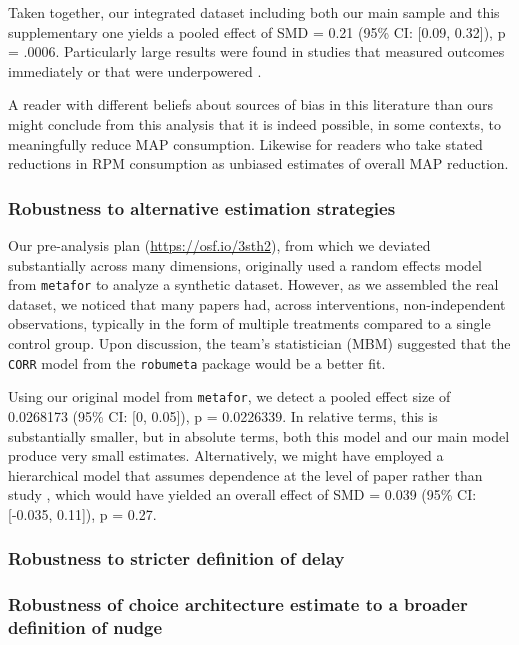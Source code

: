 \documentclass[sn-nature,referee,pdflatex]{sn-jnl}
\begin{document}
Taken together, our integrated dataset including both our main sample
and this supplementary one yields a pooled effect of SMD = 0.21 (95\%
CI: {[}0.09, 0.32{]}), p = .0006. Particularly large results were found
in studies that measured outcomes immediately \citep{hansen2021} or that
were underpowered \citep{lentz2020}.

A reader with different beliefs about sources of bias in this literature
than ours might conclude from this analysis that it is indeed possible,
in some contexts, to meaningfully reduce MAP consumption. Likewise for
readers who take stated reductions in RPM consumption as unbiased
estimates of overall MAP reduction.

\subsubsection{Robustness to alternative estimation
strategies}\label{Sec5.1.2}

Our pre-analysis plan (\url{https://osf.io/3sth2}), from which we
deviated substantially across many dimensions, originally used a random
effects model from \texttt{metafor} to analyze a synthetic dataset.
However, as we assembled the real dataset, we noticed that many papers
had, across interventions, non-independent observations, typically in
the form of multiple treatments compared to a single control group. Upon
discussion, the team's statistician (MBM) suggested that the
\texttt{CORR} model from the \texttt{robumeta} package would be a better
fit.

Using our original model from \texttt{metafor}, we detect a pooled
effect size of 0.0268173 (95\% CI: {[}0, 0.05{]}), p = 0.0226339. In
relative terms, this is substantially smaller, but in absolute terms,
both this model and our main model produce very small estimates.
Alternatively, we might have employed a hierarchical model that assumes
dependence at the level of paper rather than study \citep{stevens2009},
which would have yielded an overall effect of SMD = 0.039 (95\% CI:
{[}-0.035, 0.11{]}), p = 0.27.

\subsubsection{Robustness to stricter definition of
delay}\label{Sec5.1.3}

\subsubsection{Robustness of choice architecture estimate to a broader
definition of nudge}\label{Sec5.1.4}
\end{document}
